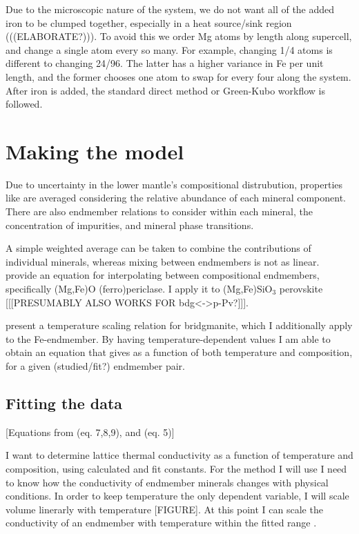 Due to the microscopic nature of the system, we do not want all of the added iron to be clumped together, especially in a heat source/sink region (((ELABORATE?))). To avoid this we order Mg atoms by length along supercell, and change a single atom every so many. For example, changing 1/4 atoms is different to changing 24/96. The latter has a higher variance in Fe per unit length, and the former chooses one atom to swap for every four along the system. After iron is added, the standard direct method or Green-Kubo workflow is followed.


\section{Making the model}

Due to uncertainty in the lower mantle's compositional distrubution, properties like \tcs are averaged considering the relative abundance of each mineral component. There are also endmember relations to consider within each mineral, the concentration of impurities, and mineral phase transitions.  

A simple weighted average can be taken to combine the contributions of individual minerals, whereas mixing between endmembers is not as linear. \citet{Ohta2017} provide an equation for interpolating \cs between compositional endmembers, specifically (Mg,Fe)O (ferro)periclase. I apply it to (Mg,Fe)SiO$_3$ perovskite [[[PRESUMABLY ALSO WORKS FOR bdg<->p-Pv?]]]. 

\citet{Okuda2017} present a temperature scaling relation for bridgmanite, which I additionally apply to the Fe-endmember. By having temperature-dependent values I am able to obtain an equation that gives \tcs as a function of both temperature and composition, for a given (studied/fit?) endmember pair.

\subsection{Fitting the data} 

[Equations from \cite{Ohta2017} (eq. 7,8,9), and \cite{Okuda2017} (eq. 5)]

I want to determine lattice thermal conductivity as a function of temperature and composition, 
using calculated and fit constants. For the method I will use I need to know how the conductivity of endmember minerals changes with physical conditions. In order to keep temperature the only dependent variable, I will scale volume linerarly with temperature [FIGURE]. At this point I can scale the conductivity of an endmember with temperature within the fitted range \citep{Okuda2017}.

